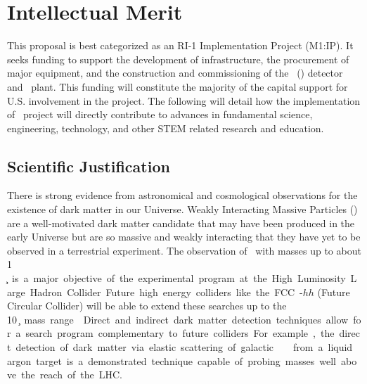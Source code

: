 \section{Intellectual Merit}

This proposal  is best categorized as an RI-1 Implementation Project (M1:IP). It seeks funding to support the development of infrastructure, the procurement of major equipment, and the construction and commissioning of the \DSk\ (\DSks) detector and \Urania\ plant.  This funding will constitute the majority of the capital support for U.S. involvement in the project.  The following will detail how the implementation of \DSk\ project will directly contribute to advances in fundamental science, engineering, technology, and other STEM related research and education.  


\subsection{Scientific Justification}


There is strong evidence from astronomical and cosmological observations for the existence of dark matter in our Universe. Weakly Interacting Massive Particles (\WIMPs) are a well-motivated dark matter candidate that may have been produced in the early Universe but are so massive and weakly interacting that they have yet to be observed in a terrestrial experiment. The observation of \WIMPs\ with masses up to about 1 \si{\TeV\per\square\c} is a major objective of the experimental program at the High Luminosity Large Hadron Collider. Future high energy colliders like the FCC-$hh$ (Future Circular Collider) will be able to extend these searches up to the  \SI{10}{\TeV\per\square\c} mass range~\cite{CERN:2017cq}. Direct and indirect dark matter detection techniques allow for a search program complementary to future colliders. For example, the direct detection of dark matter via elastic scattering of galactic \WIMPs\ from a liquid argon target is a demonstrated technique capable of probing masses well above the reach of the LHC.

